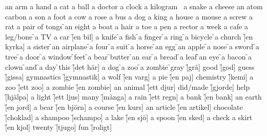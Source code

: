 \begin{questions}
    \begin{multicols}{3}
        \raggedcolumns
        \question an arm \fillin
        \question a hand \fillin
        \question a cat \fillin
        \question a ball \fillin
        \question a doctor \fillin
        \question a clock \fillin
        \question a kilogram \fillin
        \question a snake \fillin
        \question a cheese \fillin
        \question an atom \fillin
        \question carbon \fillin
        \question a son \fillin
        \question a foot \fillin
        \question a cow \fillin
        \question a rose \fillin
        \question a bus \fillin
        \question a dog \fillin
        \question a king \fillin
        \question a house \fillin
        \question a mouse \fillin
        \question a screw \fillin
        \question a rat \fillin
        \question a pair of tongs \f
        \question an eight \fillin
        \question a boat \fillin
        \question a hair \fillin
        \question a toe \fillin
        \question a pen \fillin
        \question a rector \fillin
        \question a week \fillin
        \question a cafe \fillin
        \question a leg/bone \f
        \question a TV \fillin
        \question a car \f[en bil]
        \question a knife \f
        \question a fish \f
        \question a finger \f
        \question a ring \f
        \question a bicycle \f
        \question a church \f[en kyrka]
        \question a sister \f
        \question an airplane \f
        \question a four \f
        \question a suit \f
        \question a horse \f
        \question an egg \f
        \question an apple \f
        \question a nose \f
        \question a sword \f
        \question a tree \f
        \question a door \f
        \question a window \f
        \question feet \f
        \question a bear \f
        \question butter \f
        \question an ear \f
        \question a bread \f
        \question a leaf \f
        \question an eye \f
        \question a bacon \f
        \question a clown \f
        \question and \f
        \question a day \f
        \question this \f[det här]
        \question a dog \f
        \question a zoo \f
        \question a zombie \f
        \question gray \f[grå]
        \question good \f[god]
        \question guess \f[gissa]
        \question gymnastics \f[gymnastik]
        \question a wolf \f[en varg]
        \question a pie \f[en paj]
        \question chemistry \f[kemi]
        \question a zoo \f[ett zoo]
        \question a zombie \f[en zombie]
        \question an animal \f[ett djur]
        \question did/made \f[gjorde]
        \question help \f[hjälpa]
        \question a light \f[ett ljus]
        \question many \f[många]
        \question a rain \f[ett regn]
        \question a bank \f[en bank]
        \question an earth \f[en jord]
        \question a bear \f[en björn]
        \question a course \f[en kurs]
        \question an article \f[en artikel]
        \question chocolate \f[choklad]
        \question a shampoo \f[schampo]
        \question a lake \f[en sjö]
        \question a spoon \f[en sked]
        \question a check
        \question a skirt \f[en kjol]
        \question twenty \f[tjugo]
        \question fun \f[roligt]
    \end{multicols}
\end{questions}